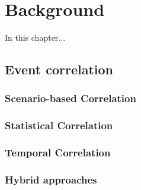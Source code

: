\chapter{Background}
\label{chap:background}

In this chapter...

\section{Event correlation}

\subsection{Scenario-based Correlation}

\subsection{Statistical Correlation}
\subsection{Temporal Correlation}
\subsection{Hybrid approaches}

